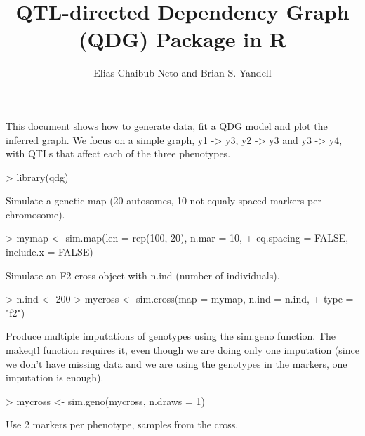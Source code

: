 \documentclass{article}
\begin{document}
\title{\textbf{QTL}-directed Dependency Graph (QDG) Package in R}
\author{Elias Chaibub Neto and Brian S. Yandell}
\maketitle



This document shows how to generate data, fit a QDG model and plot the inferred graph. We focus on a simple graph, y1 -> y3, y2 -> y3 and y3 -> y4, with QTLs that affect each of the three phenotypes.

\begin{Schunk}
\begin{Sinput}
> library(qdg)
\end{Sinput}
\end{Schunk}

Simulate a genetic map (20 autosomes, 10 not equaly spaced markers per 
chromosome).

\begin{Schunk}
\begin{Sinput}
> mymap <- sim.map(len = rep(100, 20), n.mar = 10, 
+     eq.spacing = FALSE, include.x = FALSE)
\end{Sinput}
\end{Schunk}

Simulate an F2 cross object with n.ind (number of individuals).

\begin{Schunk}
\begin{Sinput}
> n.ind <- 200
> mycross <- sim.cross(map = mymap, n.ind = n.ind, 
+     type = "f2")
\end{Sinput}
\end{Schunk}

Produce multiple imputations of genotypes using the sim.geno function. The makeqtl function requires it, even though we are doing only one imputation (since we don't have missing data and we are using the genotypes in the markers, one imputation is enough).

\begin{Schunk}
\begin{Sinput}
> mycross <- sim.geno(mycross, n.draws = 1)
\end{Sinput}
\end{Schunk}

Use 2 markers per phenotype, samples from the cross.
\end{document}
